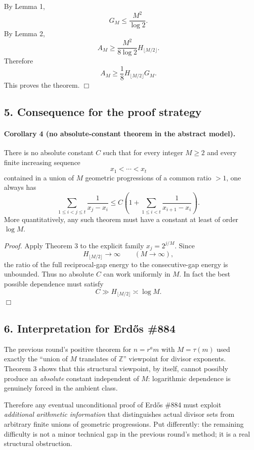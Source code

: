 By Lemma 1,
\[
G_M\le \frac{M^2}{\log 2}.
\]
By Lemma 2,
\[
A_M\ge \frac{M^2}{8\log 2}H_{\lfloor M/2\rfloor}.
\]
Therefore
\[
A_M
\ge \frac18 H_{\lfloor M/2\rfloor} G_M.
\]
This proves the theorem.
\hfill\(\Box\)

\subsection*{5. Consequence for the proof strategy}

\paragraph{Corollary 4 (no absolute-constant theorem in the abstract model).}
There is no absolute constant \(C\) such that for every integer \(M\ge 2\) and every finite increasing sequence
\[
x_1<\cdots <x_t
\]
contained in a union of \(M\) geometric progressions of a common ratio \(>1\), one always has
\[
\sum_{1\le i<j\le t}\frac{1}{x_j-x_i}
\le C\left(1+\sum_{1\le i<t}\frac{1}{x_{i+1}-x_i}\right).
\]
More quantitatively, any such theorem must have a constant at least of order \(\log M\).

\emph{Proof.}
Apply Theorem 3 to the explicit family \(x_j=2^{j/M}\). Since
\[
H_{\lfloor M/2\rfloor}\to \infty
\qquad (M\to\infty),
\]
the ratio of the full reciprocal-gap energy to the consecutive-gap energy is unbounded. Thus no absolute \(C\) can work uniformly in \(M\). In fact the best possible dependence must satisfy
\[
C\gg H_{\lfloor M/2\rfloor}\asymp \log M.
\]
\hfill\(\Box\)

\subsection*{6. Interpretation for Erd\H{o}s \#884}

The previous round's positive theorem for \(n=r^a m\) with \(M=\tau(m)\) used exactly the ``union of \(M\) translates of \(\mathbb Z\)'' viewpoint for divisor exponents. Theorem 3 shows that this structural viewpoint, by itself, cannot possibly produce an \emph{absolute} constant independent of \(M\): logarithmic dependence is genuinely forced in the ambient class.

Therefore any eventual unconditional proof of Erd\H{o}s \#884 must exploit \emph{additional arithmetic information} that distinguishes actual divisor sets from arbitrary finite unions of geometric progressions. Put differently: the remaining difficulty is not a minor technical gap in the previous round's method; it is a real structural obstruction.

